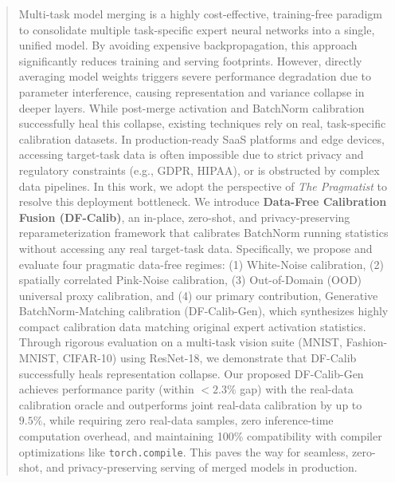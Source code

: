 \documentclass{article}
\theoremstyle{plain}
\theoremstyle{definition}
\theoremstyle{remark}
\begin{document}

\printAffiliationsAndNotice{}

\begin{abstract}
  Multi-task model merging is a highly cost-effective, training-free paradigm to consolidate multiple task-specific expert neural networks into a single, unified model. By avoiding expensive backpropagation, this approach significantly reduces training and serving footprints. However, directly averaging model weights triggers severe performance degradation due to parameter interference, causing representation and variance collapse in deeper layers. While post-merge activation and BatchNorm calibration successfully heal this collapse, existing techniques rely on real, task-specific calibration datasets. In production-ready SaaS platforms and edge devices, accessing target-task data is often impossible due to strict privacy and regulatory constraints (e.g., GDPR, HIPAA), or is obstructed by complex data pipelines. In this work, we adopt the perspective of \emph{The Pragmatist} to resolve this deployment bottleneck. We introduce \textbf{Data-Free Calibration Fusion (DF-Calib)}, an in-place, zero-shot, and privacy-preserving reparameterization framework that calibrates BatchNorm running statistics without accessing any real target-task data. Specifically, we propose and evaluate four pragmatic data-free regimes: (1) White-Noise calibration, (2) spatially correlated Pink-Noise calibration, (3) Out-of-Domain (OOD) universal proxy calibration, and (4) our primary contribution, Generative BatchNorm-Matching calibration (DF-Calib-Gen), which synthesizes highly compact calibration data matching original expert activation statistics. Through rigorous evaluation on a multi-task vision suite (MNIST, Fashion-MNIST, CIFAR-10) using ResNet-18, we demonstrate that DF-Calib successfully heals representation collapse. Our proposed DF-Calib-Gen achieves performance parity (within $<2.3\%$ gap) with the real-data calibration oracle and outperforms joint real-data calibration by up to $9.5\%$, while requiring zero real-data samples, zero inference-time computation overhead, and maintaining 100\% compatibility with compiler optimizations like \texttt{torch.compile}. This paves the way for seamless, zero-shot, and privacy-preserving serving of merged models in production.
\end{abstract}
\end{document}

